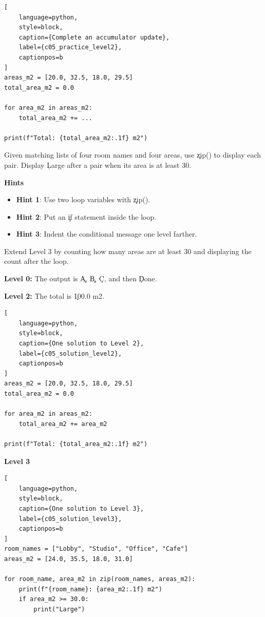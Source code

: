 \begin{lstlisting}[
    language=python,
    style=block,
    caption={Complete an accumulator update},
    label={c05_practice_level2},
    captionpos=b
]
areas_m2 = [20.0, 32.5, 18.0, 29.5]
total_area_m2 = 0.0

for area_m2 in areas_m2:
    total_area_m2 += ...

print(f"Total: {total_area_m2:.1f} m2")
\end{lstlisting}


Given matching lists of four room names and four areas, use \c{zip()} to
display each pair. Display \c{Large} after a pair when its area is at least 30.

\textbf{Hints}
\begin{itemize}
    \item \textbf{Hint 1}: Use two loop variables with \c{zip()}.
    \item \textbf{Hint 2}: Put an \c{if} statement inside the loop.
    \item \textbf{Hint 3}: Indent the conditional message one level farther.
\end{itemize}


Extend Level 3 by counting how many areas are at least 30 and displaying the
count after the loop.


\textbf{Level 0:} The output is \c{A}, \c{B}, \c{C}, and then \c{Done}.

\textbf{Level 2:} The total is \c{100.0 m2}.

\begin{lstlisting}[
    language=python,
    style=block,
    caption={One solution to Level 2},
    label={c05_solution_level2},
    captionpos=b
]
areas_m2 = [20.0, 32.5, 18.0, 29.5]
total_area_m2 = 0.0

for area_m2 in areas_m2:
    total_area_m2 += area_m2

print(f"Total: {total_area_m2:.1f} m2")
\end{lstlisting}

\textbf{Level 3}

\begin{lstlisting}[
    language=python,
    style=block,
    caption={One solution to Level 3},
    label={c05_solution_level3},
    captionpos=b
]
room_names = ["Lobby", "Studio", "Office", "Cafe"]
areas_m2 = [24.0, 35.5, 18.0, 31.0]

for room_name, area_m2 in zip(room_names, areas_m2):
    print(f"{room_name}: {area_m2:.1f} m2")
    if area_m2 >= 30.0:
        print("Large")
\end{lstlisting}

